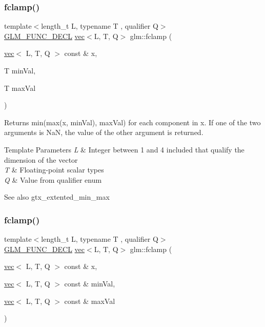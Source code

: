 \subsubsection{\texorpdfstring{fclamp()}{fclamp()}\hspace{0.1cm}{\footnotesize\ttfamily [2/3]}}
{\footnotesize\ttfamily template$<$length\+\_\+t L, typename T , qualifier Q$>$ \\
\hyperlink{setup_8hpp_ab2d052de21a70539923e9bcbf6e83a51}{G\+L\+M\+\_\+\+F\+U\+N\+C\+\_\+\+D\+E\+CL} \hyperlink{structglm_1_1vec}{vec}$<$L, T, Q$>$ glm\+::fclamp (\begin{DoxyParamCaption}\item[{\hyperlink{structglm_1_1vec}{vec}$<$ L, T, Q $>$ const \&}]{x,  }\item[{T}]{min\+Val,  }\item[{T}]{max\+Val }\end{DoxyParamCaption})}

Returns min(max(x, min\+Val), max\+Val) for each component in x. If one of the two arguments is NaN, the value of the other argument is returned.


\begin{DoxyTemplParams}{Template Parameters}
{\em L} & Integer between 1 and 4 included that qualify the dimension of the vector \\
\hline
{\em T} & Floating-\/point scalar types \\
\hline
{\em Q} & Value from qualifier enum\\
\hline
\end{DoxyTemplParams}
\begin{DoxySeeAlso}{See also}
gtx\+\_\+extented\+\_\+min\+\_\+max 
\end{DoxySeeAlso}
\mbox{\label{group__gtx__extended__min__max_ga5c15fa4709763c269c86c0b8b3aa2297}} 
\subsubsection{\texorpdfstring{fclamp()}{fclamp()}\hspace{0.1cm}{\footnotesize\ttfamily [3/3]}}
{\footnotesize\ttfamily template$<$length\+\_\+t L, typename T , qualifier Q$>$ \\
\hyperlink{setup_8hpp_ab2d052de21a70539923e9bcbf6e83a51}{G\+L\+M\+\_\+\+F\+U\+N\+C\+\_\+\+D\+E\+CL} \hyperlink{structglm_1_1vec}{vec}$<$L, T, Q$>$ glm\+::fclamp (\begin{DoxyParamCaption}\item[{\hyperlink{structglm_1_1vec}{vec}$<$ L, T, Q $>$ const \&}]{x,  }\item[{\hyperlink{structglm_1_1vec}{vec}$<$ L, T, Q $>$ const \&}]{min\+Val,  }\item[{\hyperlink{structglm_1_1vec}{vec}$<$ L, T, Q $>$ const \&}]{max\+Val }\end{DoxyParamCaption})}

